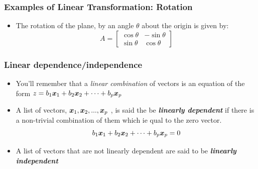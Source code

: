 \documentclass{beamer}
\begin{document}
\begin{frame}
  \frametitle{Examples of Linear Transformation: Rotation}


\begin{itemize}
\item The rotation of the plane, by an angle $\theta$ about the origin is given by:
\[
A = \left[
\begin{array}{cc}
\cos \theta & -\sin \theta\\ 
\sin \theta & \cos \theta 
\end{array}
\right]
\]
\end{itemize}

\begin{center}


\end{center}


\end{frame}

\begin{frame}
  \frametitle{Linear dependence/independence}

\begin{itemize}
\item You'll remember that a \emph{linear combination} of vectors is an equation of the form $z = b_1 \bm{x}_1 + b_2 \bm{x}_2 + \cdots + b_p \bm{x}_p$

\item A list of vectors, $\bm{x}_1, \bm{x}_2, ..., \bm{x}_p$ , is said the be \emph{\textbf{linearly dependent}} if there is a non-trivial combination of them which ie qual to the zero vector.
\[
 b_1 \bm{x}_1 + b_2 \bm{x}_2 + \cdots + b_p \bm{x}_p = 0
\]

\item A list of vectors that are not linearly dependent are said to be \emph{\textbf{linearly independent}} 

\end{itemize}

\end{frame}
\end{document}

